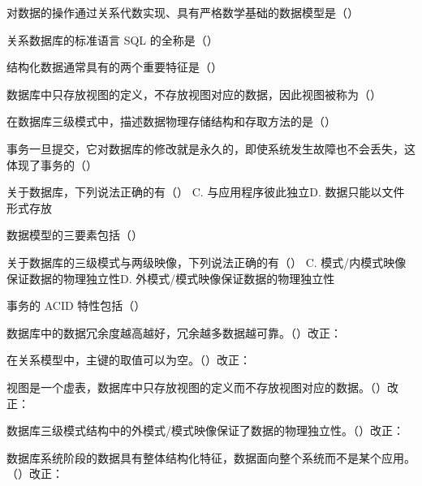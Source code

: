 \documentclass[a4paper,11pt]{article}
\begin{document}
\q 对数据的操作通过关系代数实现、具有严格数学基础的数据模型是（\quad）

\q 关系数据库的标准语言 SQL 的全称是（\quad）

\q 结构化数据通常具有的两个重要特征是（\quad）

\q 数据库中只存放视图的定义，不存放视图对应的数据，因此视图被称为（\quad）

\q 在数据库三级模式中，描述数据物理存储结构和存取方法的是（\quad）

\q 事务一旦提交，它对数据库的修改就是永久的，即使系统发生故障也不会丢失，这体现了事务的（\quad）

\q 关于数据库，下列说法正确的有（\quad）
{C. 与应用程序彼此独立}{D. 数据只能以文件形式存放}

\q 数据模型的三要素包括（\quad）

\q 关于数据库的三级模式与两级映像，下列说法正确的有（\quad）
{C. 模式/内模式映像保证数据的物理独立性}{D. 外模式/模式映像保证数据的物理独立性}

\q 事务的 ACID 特性包括（\quad）

\q 数据库中的数据冗余度越高越好，冗余越多数据越可靠。\quad（\quad）\quad 改正：\fixblank

\q 在关系模型中，主键的取值可以为空。\quad（\quad）\quad 改正：\fixblank

\q 视图是一个虚表，数据库中只存放视图的定义而不存放视图对应的数据。\quad（\quad）\quad 改正：\fixblank

\q 数据库三级模式结构中的外模式/模式映像保证了数据的物理独立性。\quad（\quad）\quad 改正：\fixblank

\q 数据库系统阶段的数据具有整体结构化特征，数据面向整个系统而不是某个应用。\quad（\quad）\quad 改正：\fixblank
\end{document}
